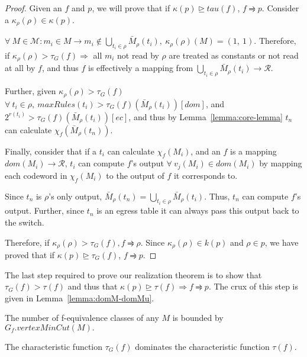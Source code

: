 \begin{proof}
Given an $f$ and $p$, we will prove that if $\kappa(p)\trianglerighteq tau(f)$, $f \rightrightharpoons p$. Consider a $\kappa_\rho(\rho) \in \kappa(p)$.

$\forall\ M \in \mathcal{M} : m_i \in M \rightarrow m_i \notin \bigcup_{t_i \in \rho} \bar{M}_\rho(t_i),\ \kappa_\rho(\rho)(M) = (1,\ 1)$. Therefore, if $\kappa_\rho(\rho) > \tau_G(f) \Rightarrow$ all $m_i$ not read by $\rho$ are treated as constants or not read at all by $f$, and thus $f$ is effectively a mapping from $\bigcup_{t_i \in \rho} \bar{M}_\rho(t_i) \rightarrow \mathcal{R}$. 

Further, given $\kappa_\rho(\rho) > \tau_G(f)$ $\forall\ t_i \in \rho,\ maxRules(t_i) > \tau_G(f)(\bar{M}_\rho(t_i))[dom]$, and $2^{r(t_i)} > \tau_G(f)(\bar{M}_\rho(t_i))[ec]$, and thus by Lemma~\ref{lemma:core-lemma} $t_n$ can calculate $\chi_f(\bar{M}_\rho(t_n))$.

Finally, consider that if a $t_i$ can calculate $\chi_f(M_i)$, and an $f$ is a mapping $dom(M_i) \rightarrow \mathcal{R}$, $t_i$ can compute $f$'s output $\forall\ v_j(M_i) \in dom(M_i)$ by mapping each codeword in $\chi_f(M_i)$ to the output of $f$ it corresponds to.

Since $t_n$ is $\rho$'s only output, $\bar{M}_\rho(t_n) = \bigcup_{t_i \in \rho} \bar{M}_\rho(t_i)$. Thus, $t_n$ can compute $f$'s output. Further, since $t_n$ is an egress table it can always pass this output back to the switch.

Therefore, if $\kappa_\rho(\rho) > \tau_G(f), f \rightrightharpoons \rho$. Since $\kappa_\rho(\rho) \in k(p)$ and $\rho \in p$, we have proved that if $\kappa(p)\trianglerighteq \tau_G(f)$, $f \rightrightharpoons p$.
\end{proof}

The last step required to prove our realization theorem is to show that $\tau_G(f) > \tau(f)$ and thus that $\kappa(p)\trianglerighteq \tau(f) \Rightarrow f \rightrightharpoons p$. The crux of this step is given in Lemma~\ref{lemma:domM-domMu}.


\begin{corrollary} The number of f-equivalence classes of any $M$ is bounded by $G_f.vertexMinCut(M).$
\label{lemma:eq-cl-approx}
\end{corrollary}

\begin{corrollary} The characteristic function $\tau_G(f)$ dominates the characteristic function $\tau(f)$.
\label{lemma:eq-cl-approx}
\end{corrollary}

